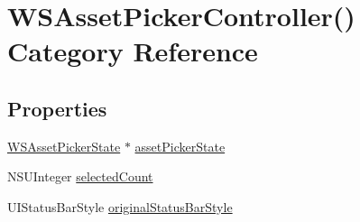 \hypertarget{category_w_s_asset_picker_controller_07_08}{\section{W\-S\-Asset\-Picker\-Controller() Category Reference}
\label{category_w_s_asset_picker_controller_07_08}
}
\subsection*{Properties}
\begin{DoxyCompactItemize}
\item 
\hyperlink{interface_w_s_asset_picker_state}{W\-S\-Asset\-Picker\-State} $\ast$ \hyperlink{category_w_s_asset_picker_controller_07_08_a7dcc2ce8ed2a142ebb72d4da9fe03beb}{asset\-Picker\-State}
\item 
N\-S\-U\-Integer \hyperlink{category_w_s_asset_picker_controller_07_08_ad410a147b7aa711049fac594ede37760}{selected\-Count}
\item 
U\-I\-Status\-Bar\-Style \hyperlink{category_w_s_asset_picker_controller_07_08_ab1a01295920a16180141095f1d52d4d5}{original\-Status\-Bar\-Style}
\end{DoxyCompactItemize}


